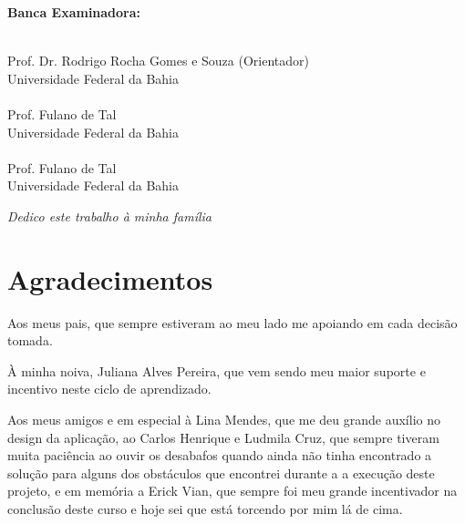 \documentclass[12pt, a4paper]{report}
\begin{document}
\vspace{1.5cm}
\begin{center}
\Large \textbf{Banca Examinadora:}
\end{center}
\vspace{1cm}

\begin{flushright}
\begin{minipage}[l]{12cm}
\begin{center}
\uline{\hspace{10.5cm}} \\
Prof. Dr. Rodrigo Rocha Gomes e Souza (Orientador) \\ Universidade Federal da Bahia \\
\vspace{1cm}
\uline{\hspace{10.5cm}} \\
Prof. Fulano de Tal\\ Universidade Federal da Bahia \\
\vspace{1cm}
\uline{\hspace{10.5cm}} \\
Prof. Fulano de Tal \\ Universidade Federal da Bahia \\


\end{center}
\end{minipage}
\end{flushright}
\thispagestyle{empty} 

\newpage
\vspace*{21.9cm}
\begin{flushright}
\textit{Dedico este trabalho à minha família}
\end{flushright}
\thispagestyle{empty} 


\newpage
\chapter*{Agradecimentos}
\thispagestyle{empty}
Aos meus pais, que sempre estiveram ao meu lado me apoiando em cada decisão tomada.

À minha noiva, Juliana Alves Pereira, que vem sendo meu maior suporte e incentivo neste ciclo de aprendizado. 

Aos meus amigos e em especial à Lina Mendes, que me deu grande auxílio no design da aplicação, ao Carlos Henrique e Ludmila Cruz, que sempre tiveram muita paciência ao ouvir os desabafos quando ainda não tinha encontrado a solução para alguns dos obstáculos que encontrei durante a a execução deste projeto, e em memória a Erick Vian, que sempre foi meu grande incentivador na conclusão deste curso e hoje sei que está torcendo por mim lá de cima.
\end{document}
